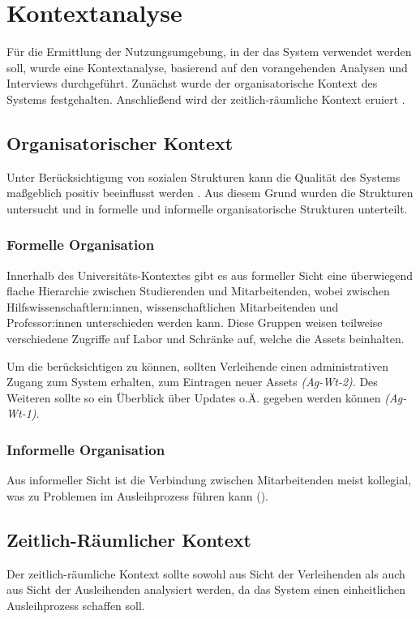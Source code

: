 \section{Kontextanalyse}
\label{section:kontext}

Für die Ermittlung der Nutzungsumgebung, in der das System verwendet werden soll, wurde eine
Kontextanalyse, basierend auf den vorangehenden Analysen und Interviews durchgeführt. Zunächst wurde
der organisatorische Kontext des Systems festgehalten. Anschließend wird der zeitlich-räumliche
Kontext eruiert \cite{herczeg_software-ergonomie_2018}.

\subsection{Organisatorischer Kontext}
Unter Berücksichtigung von sozialen Strukturen kann die Qualität des Systems maßgeblich positiv
beeinflusst werden \cite{herczeg_software-ergonomie_2018}. Aus diesem Grund wurden die Strukturen
untersucht und in formelle und informelle organisatorische Strukturen unterteilt.

\subsubsection{Formelle Organisation}
Innerhalb des Universitäts-Kontextes gibt es aus formeller Sicht eine überwiegend flache Hierarchie
zwischen Studierenden und Mitarbeitenden, wobei zwischen Hilfswissenschaftlern:innen,
wissenschaftlichen Mitarbeitenden und Professor:innen unterschieden werden kann. Diese Gruppen
weisen teilweise verschiedene Zugriffe auf Labor und Schränke auf, welche die Assets beinhalten.

Um die  berücksichtigen zu können, sollten Verleihende einen administrativen
Zugang zum System erhalten, zum Eintragen neuer Assets \textit{(Ag-Wt-2)}. Des Weiteren sollte so
ein Überblick über Updates o.Ä. gegeben werden können \textit{(Ag-Wt-1)}.

\subsubsection{Informelle Organisation}
Aus informeller Sicht ist die Verbindung zwischen Mitarbeitenden meist kollegial, was zu Problemen
im Ausleihprozess führen kann ().

\subsection{Zeitlich-Räumlicher Kontext}
\label{section:zeit}
Der zeitlich-räumliche Kontext sollte sowohl aus Sicht der Verleihenden als auch aus Sicht der
Ausleihenden analysiert werden, da das System einen einheitlichen Ausleihprozess schaffen soll.

